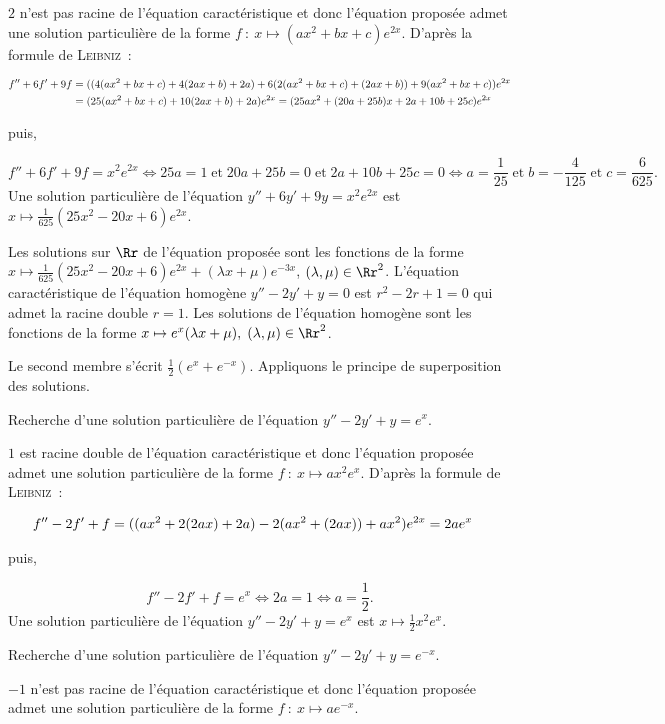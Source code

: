 {{$2$ n'est pas racine de l'équation caractéristique et donc
l'équation proposée admet une solution particulière de la forme $f~:~x\mapsto(ax^2+bx+c)e^{2x}$. D'après la formule
de \textsc{Leibniz}~:

\begin{align*}\ensuremath
f''+6f'+9f&=((4(ax^2+bx+c)+4(2ax+b)+2a)+6(2(ax^2+bx+c)+(2ax+b))+9(ax^2+bx+c))e^{2x}\\
 &=(25(ax^2+bx+c)+10(2ax+b)+2a)e^{2x}=(25ax^2+(20a+25b)x+2a+10b+25c)e^{2x}
\end{align*}

puis,

$$f''+6f'+9f=x^2e^{2x}\Leftrightarrow25a=1\;\mbox{et}\;20a+25b=0\;\mbox{et}\;2a+10b+25c=0\Leftrightarrow
a=\frac{1}{25}\;\mbox{et}\;b=-\frac{4}{125}\;\mbox{et}\;c=\frac{6}{625}.$$
Une solution particulière de l'équation $y''+6y'+9y=x^2e^{2x}$ est $x\mapsto\frac{1}{625}(25x^2-20x+6)e^{2x}$.

Les solutions sur $\Rr$ de l'équation proposée sont les fonctions de la forme
$x\mapsto\frac{1}{625}(25x^2-20x+6)e^{2x}+(\lambda x+\mu)e^{-3x}$, $(\lambda,\mu)\in\Rr^2$.
L'équation caractéristique de l'équation homogène $y''-2y'+y=0$ est $r^2-2r+1=0$ qui admet la racine double
$r=1$. Les solutions de l'équation homogène sont les fonctions de la forme $x\mapsto
e^{x}(\lambda x+\mu),\;(\lambda,\mu)\in\Rr^2$.

Le second membre s'écrit $\frac{1}{2}(e^{x}+e^{-x})$. Appliquons le principe de superposition des solutions.

Recherche d'une solution particulière de l'équation $y''-2y'+y=e^{x}$.

$1$ est racine double de l'équation caractéristique et donc
l'équation proposée admet une solution particulière de la forme $f~:~x\mapsto ax^2e^{x}$. D'après la formule
de \textsc{Leibniz}~:

\begin{align*}\ensuremath
f''-2f'+f&=((ax^2+2(2ax)+2a)-2(ax^2+(2ax))+ax^2)e^{2x}=2ae^{x}
\end{align*}

puis,

$$f''-2f'+f=e^{x}\Leftrightarrow2a=1\Leftrightarrow a=\frac{1}{2}.$$
Une solution particulière de l'équation $y''-2y'+y=e^{x}$ est $x\mapsto\frac{1}{2}x^2e^{x}$.

Recherche d'une solution particulière de l'équation $y''-2y'+y=e^{-x}$.

$-1$ n'est pas racine de l'équation caractéristique et donc
l'équation proposée admet une solution particulière de la forme $f~:~x\mapsto ae^{-x}$.

}}
